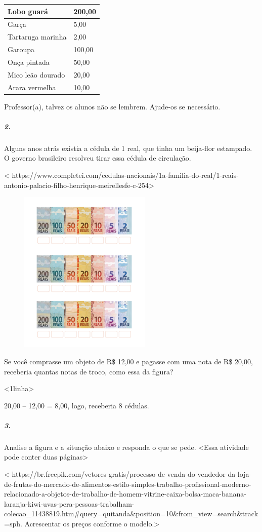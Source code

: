 \begin{longtable}[]{@{}ll@{}}
\toprule
Lobo guará & 200,00\tabularnewline
\midrule
\endhead
Garça & 5,00\tabularnewline
Tartaruga marinha & 2,00\tabularnewline
Garoupa & 100,00\tabularnewline
Onça pintada & 50,00\tabularnewline
Mico leão dourado & 20,00\tabularnewline
Arara vermelha & 10,00\tabularnewline
\bottomrule
\end{longtable}

Professor(a), talvez os alunos não se lembrem. Ajude-os se necessário.

\subparagraph{2.}\label{section-58}

Alguns anos atrás existia a cédula de 1 real, que tinha um beija-flor
estampado. O governo brasileiro resolveu tirar essa cédula de
circulação.

\textless{}
https://www.completei.com/cedulas-nacionais/1a-familia-do-real/1-reais-antonio-palacio-filho-henrique-meirellesfe-c-254\textgreater{}

\includegraphics[width=3.30208in,height=3.08528in]{media/image70.png}

Se você comprasse um objeto de R\$ 12,00 e pagasse com uma nota de R\$
20,00, receberia quantas notas de troco, como essa da figura?

\textless{}1linha\textgreater{}

20,00 -- 12,00 = 8,00, logo, receberia 8 cédulas.

\subparagraph{3.}\label{section-59}

Analise a figura e a situação abaixo e responda o que se pede.
\textless{}Essa atividade pode conter duas páginas\textgreater{}

\textless{}
https://br.freepik.com/vetores-gratis/processo-de-venda-do-vendedor-da-loja-de-frutas-do-mercado-de-alimentos-estilo-simples-trabalho-profissional-moderno-relacionado-a-objetos-de-trabalho-de-homem-vitrine-caixa-bolsa-maca-banana-laranja-kiwi-uvas-pera-pessoas-trabalham-colecao\_11438819.htm\#query=quitanda\&position=10\&from\_view=search\&track=sph.
Acrescentar os preços conforme o modelo.\textgreater{}

